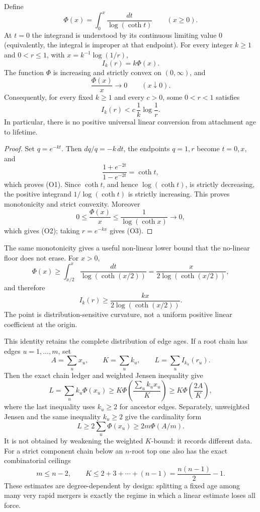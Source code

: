 \documentclass[11pt]{article}
\begin{document}
\begin{theorem}
\label{res:orlicz-currency}
Define
\[
 \Phi(x)=\int_0^x\frac{dt}{\log(\coth t)}\qquad(x\ge0).
\]
At $t=0$ the integrand is understood by its continuous limiting value $0$
(equivalently, the integral is improper at that endpoint).
For every integer $k\ge1$ and $0<r\le1$, with
$x=k^{-1}\log(1/r)$,
\[
 I_k(r)=k\Phi(x).                                      \tag{O1}
\]
The function $\Phi$ is increasing and strictly convex on $(0,\infty)$, and
\[
 \frac{\Phi(x)}x\longrightarrow0\qquad(x\downarrow0). \tag{O2}
\]
Consequently, for every fixed $k\ge1$ and every $c>0$, some $0<r<1$
satisfies
\[
 I_k(r)<c\,\frac1k\log\frac1r.                        \tag{O3}
\]
In particular, there is no positive universal linear conversion from
attachment age to lifetime.
\end{theorem}

\begin{proof}
Set $q=e^{-kt}$.  Then $dq/q=-k\,dt$, the endpoints $q=1,r$ become
$t=0,x$, and
\[
 \frac{1+e^{-2t}}{1-e^{-2t}}=\coth t,
\]
which proves (O1).  Since $\coth t$, and hence $\log(\coth t)$, is strictly
decreasing, the positive integrand $1/\log(\coth t)$ is strictly increasing.
This proves monotonicity and strict convexity.  Moreover
\[
 0\le\frac{\Phi(x)}x\le\frac1{\log(\coth x)}\longrightarrow0,
\]
which gives (O2); taking $r=e^{-kx}$ gives (O3).
\end{proof}

The same monotonicity gives a useful non-linear lower bound that the no-linear
floor does not erase.  For $x>0$,
\[
 \Phi(x)\ge\int_{x/2}^x\frac{dt}{\log(\coth(x/2))}
 =\frac{x}{2\log(\coth(x/2))},
\]
and therefore
\[
 I_k(r)\ge
 \frac{kx}{2\log(\coth(x/2))}.                       \tag{O3$'$}
\]
The point is distribution-sensitive curvature, not a uniform positive linear
coefficient at the origin.

This identity retains the complete distribution of edge ages.  If a root
chain has edges $u=1,\ldots,m$, set
\[
 A=\sum_u x_u,\qquad K=\sum_u k_u,\qquad
 L=\sum_u I_{k_u}(r_u).
\]
Then the exact chain ledger and weighted Jensen inequality give
\[
L=\sum_u k_u\Phi(x_u)
 \ge K\Phi\!\left(\frac{\sum_u k_ux_u}{K}\right)
 \ge K\Phi\!\left(\frac{2A}{K}\right),                \tag{O4}
\]
where the last inequality uses $k_u\ge2$ for ancestor edges.  Separately,
unweighted Jensen and the same inequality $k_u\ge2$ give the
cardinality form
\[
 L\ge2\sum_u\Phi(x_u)\ge2m\Phi(A/m).                  \tag{O4$'$}
\]
It is not obtained by weakening the weighted $K$-bound: it records different
data.  For a strict component chain below an $n$-root top one also has the
exact combinatorial ceilings
\[
 m\le n-2,
 \qquad
 K\le2+3+\cdots+(n-1)=\frac{n(n-1)}2-1.
\]
These estimates are
degree-dependent by design: splitting a fixed age among many very rapid
mergers is exactly the regime in which a linear estimate loses all force.
\end{document}
